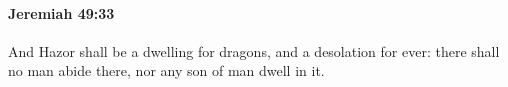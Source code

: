 
		\paragraph{Jeremiah 49:33} %
			\label{JEREMIAH-49-33}

			And Hazor shall be a dwelling for dragons, and a desolation for ever: there shall no man abide there, nor any son of man dwell in it.


